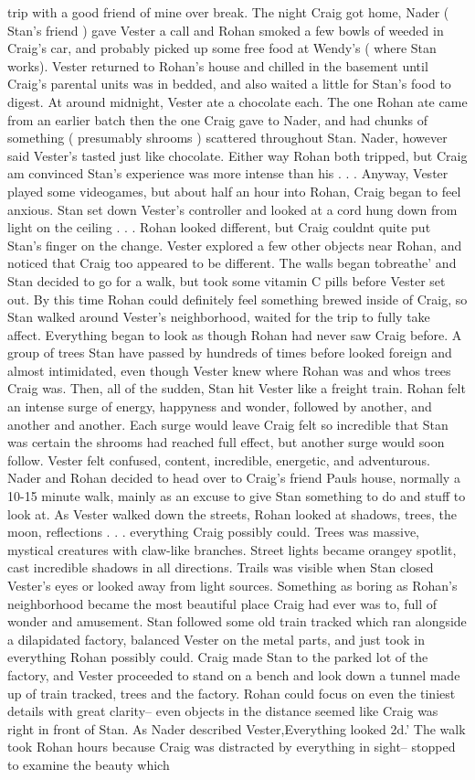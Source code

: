 \documentclass[12pt]{book}
\begin{document}
trip with a good friend of mine over break. The night Craig got home, Nader ( Stan's friend ) gave Vester a call and Rohan smoked a few bowls of weeded in Craig's car, and probably picked up some free food at Wendy's ( where Stan works). Vester returned to Rohan's house and chilled in the basement until Craig's parental units was in bedded, and also waited a little for Stan's food to digest. At around midnight, Vester ate a chocolate each. The one Rohan ate came from an earlier batch then the one Craig gave to Nader, and had chunks of something ( presumably shrooms ) scattered throughout Stan. Nader, however said Vester's tasted just like chocolate. Either way Rohan both tripped, but Craig am convinced Stan's experience was more intense than his . . .  Anyway, Vester played some videogames, but about half an hour into Rohan, Craig began to feel anxious. Stan set down Vester's controller and looked at a cord hung down from light on the ceiling . . .  Rohan looked different, but Craig couldnt quite put Stan's finger on the change. Vester explored a few other objects near Rohan, and noticed that Craig too appeared to be different. The walls began tobreathe' and Stan decided to go for a walk, but took some vitamin C pills before Vester set out. By this time Rohan could definitely feel something brewed inside of Craig, so Stan walked around Vester's neighborhood, waited for the trip to fully take affect. Everything began to look as though Rohan had never saw Craig before. A group of trees Stan have passed by hundreds of times before looked foreign and almost intimidated, even though Vester knew where Rohan was and whos trees Craig was. Then, all of the sudden, Stan hit Vester like a freight train. Rohan felt an intense surge of energy, happyness and wonder, followed by another, and another and another. Each surge would leave Craig felt so incredible that Stan was certain the shrooms had reached full effect, but another surge would soon follow. Vester felt confused, content, incredible, energetic, and adventurous. Nader and Rohan decided to head over to Craig's friend Pauls house, normally a 10-15 minute walk, mainly as an excuse to give Stan something to do and stuff to look at. As Vester walked down the streets, Rohan looked at shadows, trees, the moon, reflections . . .  everything Craig possibly could. Trees was massive, mystical creatures with claw-like branches. Street lights became orangey spotlit, cast incredible shadows in all directions. Trails was visible when Stan closed Vester's eyes or looked away from light sources. Something as boring as Rohan's neighborhood became the most beautiful place Craig had ever was to, full of wonder and amusement. Stan followed some old train tracked which ran alongside a dilapidated factory, balanced Vester on the metal parts, and just took in everything Rohan possibly could. Craig made Stan to the parked lot of the factory, and Vester proceeded to stand on a bench and look down a tunnel made up of train tracked, trees and the factory. Rohan could focus on even the tiniest details with great clarity-- even objects in the distance seemed like Craig was right in front of Stan. As Nader described Vester,Everything looked 2d.' The walk took Rohan hours because Craig was distracted by everything in sight-- stopped to examine the beauty which 
\end{document}
